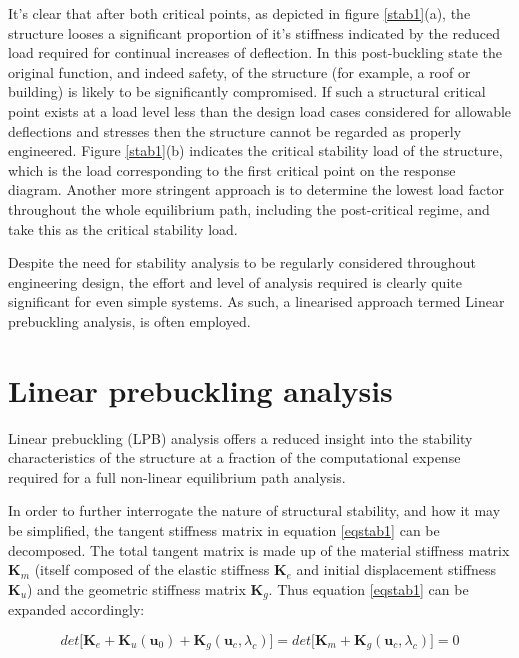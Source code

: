 It's clear that after both critical points, as depicted in figure \ref{stab1}(a), the structure looses a significant proportion of it's stiffness indicated by the reduced load required for continual increases of deflection. In this post-buckling state the original function, and indeed safety, of the structure (for example, a roof or building) is likely to be significantly compromised. If such a structural critical point exists at a load level less than the design load cases considered for allowable deflections and stresses then the structure cannot be regarded as properly engineered. Figure \ref{stab1}(b) indicates the critical stability load of the structure, which is the load corresponding to the first critical point on the response diagram. Another more stringent approach is to determine the lowest load factor throughout the whole equilibrium path, including the post-critical regime, and take this as the critical stability load.

Despite the need for stability analysis to be regularly considered throughout engineering design, the effort and level of analysis required is clearly quite significant for even simple systems. As such, a linearised approach termed Linear prebuckling analysis, is often employed.

\section{Linear prebuckling analysis}
Linear prebuckling (LPB) analysis offers a reduced insight into the stability characteristics of the structure at a fraction of the computational expense required for a full non-linear equilibrium path analysis.

In order to further interrogate the nature of structural stability, and how it may be simplified, the tangent stiffness matrix in equation \ref{eqstab1} can be decomposed. The total tangent matrix is made up of the material stiffness matrix $\mathbf{K}_m$ (itself composed of the elastic stiffness $\mathbf{K}_e$ and initial displacement stiffness $\mathbf{K}_u$) and the geometric stiffness matrix $\mathbf{K}_g$. Thus equation \ref{eqstab1} can be expanded accordingly:

\begin{equation} 
det\big[
\mathbf{K}_e +
\mathbf{K}_u(\mathbf{u}_0) +
\mathbf{K}_g(\mathbf{u}_c,\lambda_c)
\big] = 
det\big[
\mathbf{K}_m +
\mathbf{K}_g(\mathbf{u}_c,\lambda_c)
\big] = 0
\label{eqstab2}
\end{equation}


